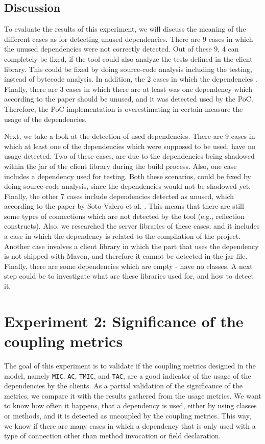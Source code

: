 \subsection{Discussion}
To evaluate the results of this experiment, we will discuss the meaning of the different cases as for detecting unused dependencies. There are 9 cases in which the unused dependencies were not correctly detected. Out of these 9, 4 can completely be fixed, if the tool could also analyze the tests defined in the client library. This could be fixed by doing source-code analysis including the testing, instead of bytecode analysis. In addition, the 2 cases in which the dependencies . Finally, there are 3 cases in which there are at least was one dependency which according to the paper should be unused, and it was detected used by the PoC. Therefore, the PoC implementation is overestimating in certain measure the usage of the dependencies.

Next, we take a look at the detection of used dependencies. There are 9 cases in which at least one of the dependencies which were supposed to be used, have no usage detected. Two of these cases, are due to the dependencies being shadowed within the jar of the client library during the build process. Also, one case includes a dependency used for testing. Both these scenarios, could be fixed by doing source-code analysis, since the dependencies would not be shadowed yet. Finally, the other 7 cases include dependencies detected as unused, which according to the paper by Soto-Valero et al. \cite{soto2020comprehensive}. This means that there are still some types of connections which are not detected by the tool (e.g., reflection constructs). Also, we researched the server libraries of these cases, and it includes a case in which the dependency is related to the compilation of the project. Another case involves a client library in which the part that uses the dependency is not shipped with Maven, and therefore it cannot be detected in the jar file. Finally, there are some dependencies which are empty - have no classes. A next step could be to investigate what are these libraries used for, and how to detect it.

\section{Experiment 2: Significance of the coupling metrics}

The goal of this experiment is to validate if the coupling metrics designed in the model, namely \texttt{MIC}, \texttt{AC}, \texttt{TMIC}, and \texttt{TAC}, are a good indicator of the usage of the dependencies by the clients. As a partial validation of the significance of the metrics, we compare it with the results gathered from the usage metrics. We want to know how often it happens, that a dependency is used, either by using classes or methods, and it is detected as uncoupled by the coupling metrics. This way, we know if there are many cases in which a dependency that is only used with a type of connection other than method invocation or field declaration.


